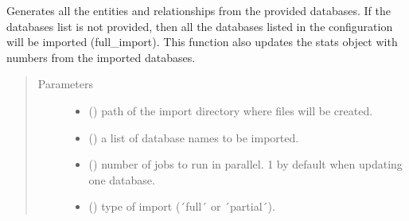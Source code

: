 \documentclass[letterpaper,10pt,english]{sphinxmanual}
\begin{document}

\begin{fulllineitems}
\label{\detokenize{_autosummary/graphdb_builder.builder:graphdb_builder.builder.importer.databasesImport}}
Generates all the entities and relationships from the provided databases. If the databases list is    not provided, then all the databases listed in the configuration will be imported (full\_import).    This function also updates the stats object with numbers from the imported databases.
\begin{quote}\begin{description}
\item[{Parameters}] \leavevmode\begin{itemize}
\item {} 
 () \textendash{} path of the import directory where files will be created.

\item {} 
 () \textendash{} a list of database names to be imported.

\item {} 
 () \textendash{} number of jobs to run in parallel. 1 by default when updating one database.

\item {} 
 () \textendash{} type of import (´full´ or ´partial´).

\end{itemize}

\end{description}\end{quote}

\end{fulllineitems}
\end{document}
